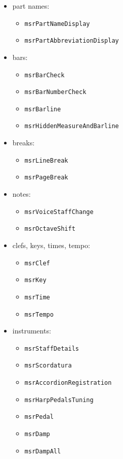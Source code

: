 \begin{itemize}
\item part names:
  \begin{itemize}
  \item {\tt msrPartNameDisplay}
  \item {\tt msrPartAbbreviationDisplay}
  \end{itemize}

\item bars:
  \begin{itemize}
  \item {\tt msrBarCheck}
  \item {\tt msrBarNumberCheck}
  \item {\tt msrBarline}
  \item {\tt msrHiddenMeasureAndBarline}
  \end{itemize}

\item breaks:
  \begin{itemize}
  \item {\tt msrLineBreak}
  \item {\tt msrPageBreak}
  \end{itemize}

\item notes:
  \begin{itemize}
  \item {\tt msrVoiceStaffChange}
  \item {\tt msrOctaveShift}
  \end{itemize}

\item clefs, keys, times, tempo:
  \begin{itemize}
  \item {\tt msrClef}
  \item {\tt msrKey}
  \item {\tt msrTime}
  \item {\tt msrTempo}
  \end{itemize}

\item instruments:
  \begin{itemize}
  \item {\tt msrStaffDetails}
  \item {\tt msrScordatura}
  \item {\tt msrAccordionRegistration}
  \item {\tt msrHarpPedalsTuning}
  \item {\tt msrPedal}
  \item {\tt msrDamp}
  \item {\tt msrDampAll}
  \end{itemize}


\end{itemize}

